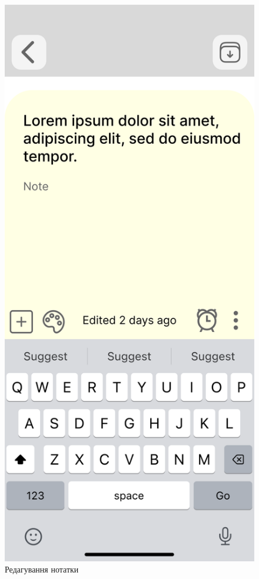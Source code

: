 \documentclass[oneside,14pt]{extarticle}
\begin{document}
\begin{normalsize}
\begin{figure}[H]
\begin{minipage}{0.48\textwidth}
		\end{minipage}\hfill
		\begin{minipage}{0.48\textwidth}
			\centering
			\includegraphics[scale=0.13]{Frame 8}
			\caption{Редагування нотатки}
		\end{minipage}
	\end{figure}
	

\end{normalsize}
\end{document}

